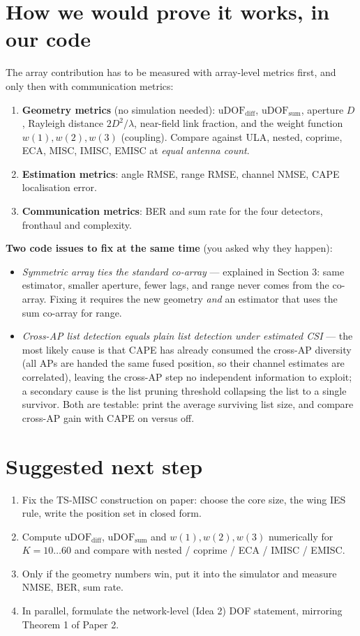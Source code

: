 \documentclass[11pt]{article}
\begin{document}
\section{How we would prove it works, in our code}

The array contribution has to be measured with array-level metrics first, and only then with
communication metrics:
\begin{enumerate}
\item \textbf{Geometry metrics} (no simulation needed): $\mathrm{uDOF}_{\mathrm{diff}}$,
$\mathrm{uDOF}_{\mathrm{sum}}$, aperture $D$, Rayleigh distance $2D^2/\lambda$, near-field link
fraction, and the weight function $w(1),w(2),w(3)$ (coupling). Compare against ULA, nested, coprime,
ECA, MISC, IMISC, EMISC at \emph{equal antenna count}.
\item \textbf{Estimation metrics}: angle RMSE, range RMSE, channel NMSE, CAPE localisation error.
\item \textbf{Communication metrics}: BER and sum rate for the four detectors, fronthaul and
complexity.
\end{enumerate}

\textbf{Two code issues to fix at the same time} (you asked why they happen):
\begin{itemize}
\item \emph{Symmetric array ties the standard co-array} --- explained in Section 3: same estimator,
smaller aperture, fewer lags, and range never comes from the co-array. Fixing it requires the new
geometry \emph{and} an estimator that uses the sum co-array for range.
\item \emph{Cross-AP list detection equals plain list detection under estimated CSI} --- the most
likely cause is that CAPE has already consumed the cross-AP diversity (all APs are handed the same
fused position, so their channel estimates are correlated), leaving the cross-AP step no independent
information to exploit; a secondary cause is the list pruning threshold collapsing the list to a
single survivor. Both are testable: print the average surviving list size, and compare cross-AP gain
with CAPE on versus off.
\end{itemize}

\section{Suggested next step}

\begin{enumerate}
\item Fix the TS-MISC construction on paper: choose the core size, the wing IES rule, write the
position set in closed form.
\item Compute $\mathrm{uDOF}_{\mathrm{diff}}$, $\mathrm{uDOF}_{\mathrm{sum}}$ and $w(1),w(2),w(3)$
numerically for $K=10\dots60$ and compare with nested / coprime / ECA / IMISC / EMISC.
\item Only if the geometry numbers win, put it into the simulator and measure NMSE, BER, sum rate.
\item In parallel, formulate the network-level (Idea 2) DOF statement, mirroring Theorem 1 of
Paper 2.
\end{enumerate}
\end{document}
